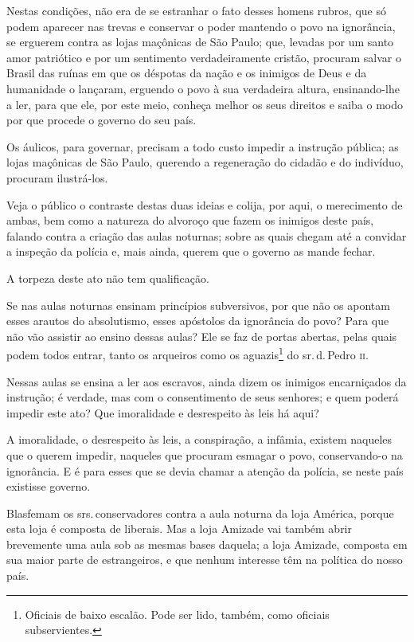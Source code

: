 Nestas condições, não era de se estranhar o fato desses homens rubros,
que só podem aparecer nas trevas e conservar o poder mantendo o povo na
ignorância, se erguerem contra as lojas maçônicas de São Paulo; que,
levadas por um santo amor patriótico e por um sentimento verdadeiramente
cristão, procuram salvar o Brasil das ruínas em que os déspotas da nação
e os inimigos de Deus e da humanidade o lançaram, erguendo o povo à sua
verdadeira altura, ensinando-lhe a ler, para que ele, por este meio,
conheça melhor os seus direitos e saiba o modo por que procede o governo
do seu país.

Os áulicos, para governar, precisam a todo custo impedir a instrução
pública; as lojas maçônicas de São Paulo, querendo a regeneração do
cidadão e do indivíduo, procuram ilustrá-los.

Veja o público o contraste destas duas ideias e colija, por aqui, o
merecimento de ambas, bem como a natureza do alvoroço que fazem os
inimigos deste país, falando contra a criação das aulas noturnas; sobre
as quais chegam até a convidar a inspeção da polícia e, mais ainda,
querem que o governo as mande fechar.

A torpeza deste ato não tem qualificação.

Se nas aulas noturnas ensinam princípios subversivos, por que não os
apontam esses arautos do absolutismo, esses apóstolos da ignorância do
povo? Para que não vão assistir ao ensino dessas aulas? Ele se faz de
portas abertas, pelas quais podem todos entrar, tanto os arqueiros como
os aguazis\footnote{Oficiais de baixo escalão. Pode ser lido, também,
  como oficiais subservientes.} do sr.\,d.\,Pedro \textsc{ii}.

Nessas aulas se ensina a ler aos escravos, ainda dizem os inimigos
encarniçados da instrução; é verdade, mas com o consentimento de seus
senhores; e quem poderá impedir este ato? Que imoralidade e desrespeito
às leis há aqui?

A imoralidade, o desrespeito às leis, a conspiração, a infâmia, existem
naqueles que o querem impedir, naqueles que procuram esmagar o povo,
conservando-o na ignorância. E é para esses que se devia chamar a
atenção da polícia, se neste país existisse governo.

Blasfemam os srs.\,conservadores contra a aula noturna da loja América,
porque esta loja é composta de liberais. Mas a loja Amizade vai também
abrir brevemente uma aula sob as mesmas bases daquela; a loja Amizade,
composta em sua maior parte de estrangeiros, e que nenhum interesse têm
na política do nosso país.

